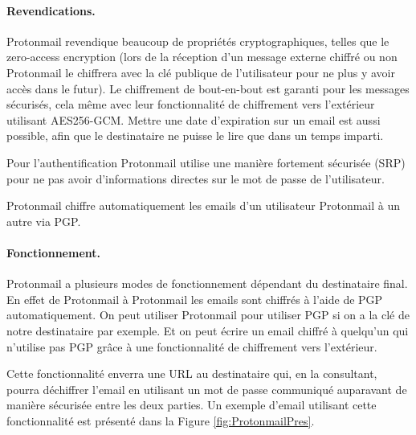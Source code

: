 \paragraph*{Revendications.}
Protonmail revendique beaucoup de propriétés cryptographiques, telles que le zero-access encryption (lors de la réception d'un message externe chiffré ou non Protonmail le chiffrera avec la clé publique de l'utilisateur pour ne plus y avoir accès dans le futur). Le chiffrement de bout-en-bout est garanti pour les messages sécurisés, cela même avec leur fonctionnalité de chiffrement vers l'extérieur utilisant AES256-GCM. Mettre une date d'expiration sur un email est aussi possible, afin que le destinataire ne puisse le lire que dans un temps imparti.

Pour l'authentification Protonmail utilise une manière fortement sécurisée (SRP) pour ne pas avoir d'informations directes sur le mot de passe de l'utilisateur.

Protonmail chiffre automatiquement les emails d'un utilisateur Protonmail à un autre via PGP.
\paragraph*{Fonctionnement.}
Protonmail a plusieurs modes de fonctionnement dépendant du destinataire final. En effet de Protonmail à Protonmail les emails sont chiffrés à l'aide de PGP automatiquement. On peut utiliser Protonmail pour utiliser PGP si on a la clé de notre destinataire par exemple. Et on peut écrire un email chiffré à quelqu'un qui n'utilise pas PGP grâce à une fonctionnalité de chiffrement vers l'extérieur.

Cette fonctionnalité enverra une URL au destinataire qui, en la consultant, pourra déchiffrer l'email en utilisant un mot de passe communiqué auparavant de manière sécurisée entre les deux parties. Un exemple d'email utilisant cette fonctionnalité est présenté dans la Figure \ref{fig:ProtonmailPres}.

